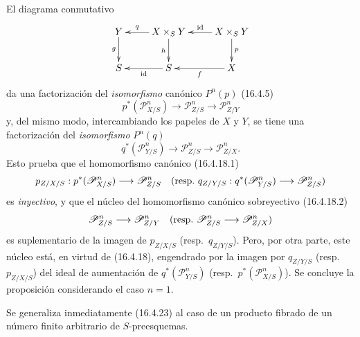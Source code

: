 El diagrama conmutativo
\[
  \xymatrix{
    Y\ar[d]_-g&X\times_S Y\ar[l]_-q\ar[d]_-h&
      X\times_S Y\ar[l]_-{\operatorname{id}}\ar[d]^-p\\
    S&S\ar[l]^-{\operatorname{id}}&X\ar[l]^-f
  }
\]
da una factorización del \emph{isomorfismo} canónico $P^n(p)$ (16.4.5)
\[
  p^*(\mathscr{P}_{X/S}^n)\longrightarrow
  \mathscr{P}_{Z/S}^n\longrightarrow\mathscr{P}_{Z/Y}^n
\]
y, del mismo modo, intercambiando los papeles de $X$ y $Y$, se tiene una factorización
del \emph{isomorfismo} $P^n(q)$
\[
  q^*(\mathscr{P}_{Y/S}^n)\longrightarrow
  \mathscr{P}_{Z/S}^n\longrightarrow\mathscr{P}_{Z/X}^n.
\]
Esto prueba que el homomorfismo canónico (16.4.18.1)
\[
  p_{Z/X/S}:p^*(\mathscr{P}_{X/S}^n)\longrightarrow\mathscr{P}_{Z/S}^n
  \quad\text{(resp.\
  $q_{Z/Y/S}:q^*(\mathscr{P}_{Y/S}^n)\to\mathscr{P}_{Z/S}^n$)}
\]
es \emph{inyectivo}, y que el núcleo del homomorfismo canónico sobreyectivo
(16.4.18.2)
\[
  \mathscr{P}_{Z/S}^n\longrightarrow\mathscr{P}_{Z/Y}^n
  \quad\text{(resp.\
  $\mathscr{P}_{Z/S}^n\to\mathscr{P}_{Z/X}^n$)}
\]
es suplementario de la imagen de $p_{Z/X/S}$ (resp.\ $q_{Z/Y/S}$). Pero,
por otra parte, este núcleo está, en virtud de (16.4.18), engendrado por la imagen por
$q_{Z/Y/S}$ (resp.\ $p_{Z/X/S}$) del ideal de aumentación de
$q^*(\mathscr{P}_{Y/S}^n)$ (resp.\ $p^*(\mathscr{P}_{X/S}^n)$). Se concluye
la proposición considerando el caso $n=1$.

Se generaliza inmediatamente (16.4.23) al caso de un producto fibrado de un número finito
arbitrario de $S$-preesquemas.


